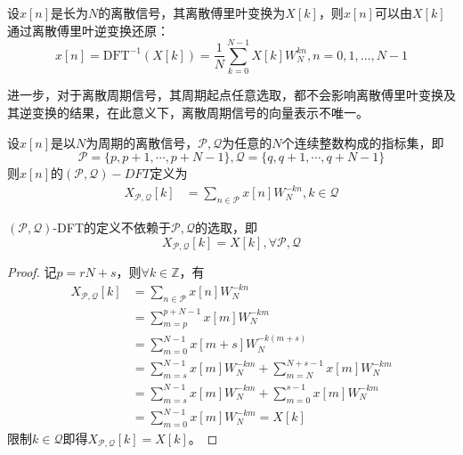 \begin{theorem}[离散傅里叶反演公式]
    设$x[n]$是长为$N$的离散信号，其离散傅里叶变换为$X[k]$，则$x[n]$可以由$X[k]$通过离散傅里叶逆变换还原：
    \[x[n]=\text{DFT}^{-1}(X[k])=\frac{1}{N}\sum_{k=0}^{N-1}X[k]W_N^{kn},n=0,1,\dots,N-1\]
\end{theorem}

进一步，对于离散周期信号，其周期起点任意选取，都不会影响离散傅里叶变换及其逆变换的结果，在此意义下，离散周期信号的向量表示不唯一。
\begin{definition}
    设$x[n]$是以$N$为周期的离散信号，$\mathcal{P} ,\mathcal{Q} $为任意的$N$个连续整数构成的指标集，即
    \[\mathcal{P} =\{p,p+1,\cdots,p+N-1\},\mathcal{Q} =\{q,q+1,\cdots,q+N-1\}\]
    则$x[n]$的$(\mathcal{P} ,\mathcal{Q} )-DFT$定义为
    \begin{align*}
    X_{\mathcal{P} ,\mathcal{Q} }[k]&=\sum_{n\in\mathcal{P} }x[n]W_N^{-kn},k\in\mathcal{Q}
    \end{align*}
\end{definition}
\begin{proposition}
    $(\mathcal{P} ,\mathcal{Q} )$-DFT的定义不依赖于$\mathcal{P} ,\mathcal{Q} $的选取，即
    \[X_{\mathcal{P} ,\mathcal{Q} }[k]=X[k],\forall \mathcal{P} ,\mathcal{Q} \]
\end{proposition}
\begin{proof}
    记$p=rN+s$，则$\forall k\in\mathbb{Z}$，有\begin{align*}
    X_{\mathcal{P} ,\mathcal{Q} }[k]&=\sum_{n\in\mathcal{P} }x[n]W_N^{-kn}\\
    &=\sum_{m=p}^{p+N-1}x[m]W_N^{-km}\\
    &=\sum_{m=0}^{N-1}x[m+s]W_N^{-k(m+s)}\\
    &=\sum_{m=s}^{N-1}x[m]W_N^{-km}+\sum_{m=N}^{N+s-1}x[m]W_N^{-km}\\
    &=\sum_{m=s}^{N-1}x[m]W_N^{-km}+\sum_{m=0}^{s-1}x[m]W_N^{-km}\\
    &=\sum_{m=0}^{N-1}x[m]W_N^{-km}=X[k]
    \end{align*}
    限制$k\in\mathcal{Q} $即得$X_{\mathcal{P} ,\mathcal{Q} }[k]=X[k]$。
\end{proof}

